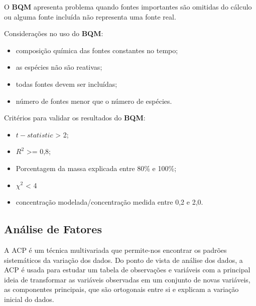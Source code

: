 
O \textbf{BQM} apresenta problema quando fontes importantes são omitidas do
cálculo ou alguma fonte incluída não representa uma fonte real.

Considerações no uso do \textbf{BQM}: 
\begin{itemize}
  \item composição química das fontes constantes no tempo;
  \item as espécies não são reativas;
  \item todas fontes devem ser incluídas;
  \item número de fontes menor que o número de espécies.
\end{itemize}


Critérios para validar os resultados do \textbf{BQM}:

\begin{itemize}
  \item $t-statistic$ > 2;
  \item $R^2$ >= 0,8;
  \item Porcentagem da massa explicada entre 80\% e 100\%; 
  \item ${\chi}^2$ < 4
  \item concentração modelada/concentração medida entre 0,2 e 2,0.
\end{itemize}

\subsection{Análise de Fatores}

A ACP é um técnica multivariada que permite-nos encontrar os padrões 
sistemáticos da variação dos dados. 
Do ponto de vista de análise dos dados, a ACP é usada para estudar um 
tabela de observações e variáveis com a principal ideia de transformar 
as variáveis observadas em um conjunto de novas variáveis, 
as componentes principais, que são ortogonais entre si 
e explicam a variação inicial do dados.

